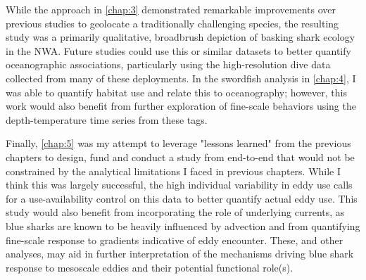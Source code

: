 While the approach in \cref{chap:3} demonstrated remarkable improvements over previous studies to geolocate a traditionally challenging species, the resulting study was a primarily qualitative, broadbrush depiction of basking shark ecology in the NWA. Future studies could use this or similar datasets to better quantify oceanographic associations, particularly using the high-resolution dive data collected from many of these deployments. In the swordfish analysis in \cref{chap:4}, I was able to quantify habitat use and relate this to oceanography; however, this work would also benefit from further exploration of fine-scale behaviors using the depth-temperature time series from these tags.

Finally, \cref{chap:5} was my attempt to leverage "lessons learned" from the previous chapters to design, fund and conduct a study from end-to-end that would not be constrained by the analytical limitations I faced in previous chapters. While I think this was largely successful, the high individual variability in eddy use calls for a use-availability control on this data to better quantify actual eddy use. This study would also benefit from incorporating the role of underlying currents, as blue sharks are known to be heavily influenced by advection \citep[\eg][]{Carey1990} and from quantifying fine-scale response to gradients indicative of eddy encounter. These, and other analyses, may aid in further interpretation of the mechanisms driving blue shark response to mesoscale eddies and their potential functional role(s).



